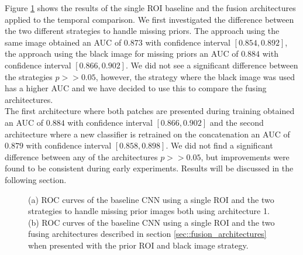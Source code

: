 \documentclass[12pt]{spieman}  %
\begin{document}
Figure \ref{fig::temporal_comparison} shows the results of the single ROI baseline and the fusion architectures applied to the temporal comparison. We first investigated the difference between the two different strategies to handle missing priors. The approach using the same image obtained an AUC of $0.873$ with confidence interval $[0.854, 0.892]$, the approach using the black image for missing priors an AUC of $0.884$ with confidence interval $[0.866, 0.902]$. We did not see a significant difference between the strategies $p >> 0.05$, however, the strategy where the black image was used has a higher AUC and we have decided to use this to compare the fusing architectures. \\
The first architecture where both patches are presented during training obtained an AUC of $0.884$ with confidence interval $[0.866, 0.902]$ and the second architecture where a new classifier is retrained on the concatenation an AUC of $0.879$ with confidence interval $[0.858, 0.898]$.  We did not find a significant difference between any of the architectures $p >> 0.05$, but improvements were found to be consistent during early experiments. Results will be discussed in the following section.

\begin{figure}
 \centering
 \caption{(a) ROC curves of the baseline CNN using a single ROI and the two strategies to handle missing prior images both using architecture 1. (b) ROC curves of the baseline CNN using a single ROI and the two fusing architectures described in section \ref{sec::fusion_architectures} when presented with the prior ROI and black image strategy.}
 \label{fig::temporal_comparison}
\end{figure}
\end{document}
